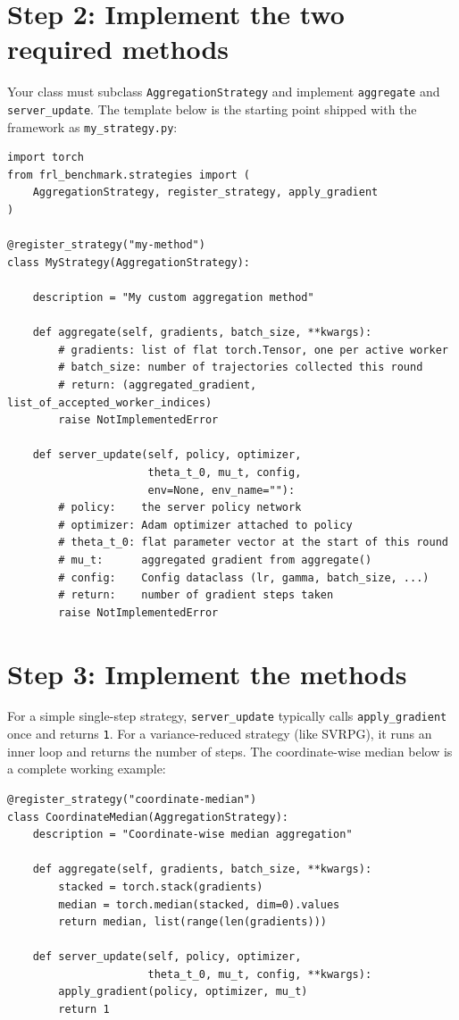 \documentclass[a4paper, oneside]{discothesis}
\begin{document}
\section*{Step 2: Implement the two required methods}

Your class must subclass \texttt{AggregationStrategy} and implement \texttt{aggregate} and \texttt{server\_update}. The template below is the starting point shipped with the framework as \texttt{my\_strategy.py}:

\begin{verbatim}
import torch
from frl_benchmark.strategies import (
    AggregationStrategy, register_strategy, apply_gradient
)

@register_strategy("my-method")
class MyStrategy(AggregationStrategy):

    description = "My custom aggregation method"

    def aggregate(self, gradients, batch_size, **kwargs):
        # gradients: list of flat torch.Tensor, one per active worker
        # batch_size: number of trajectories collected this round
        # return: (aggregated_gradient, list_of_accepted_worker_indices)
        raise NotImplementedError

    def server_update(self, policy, optimizer,
                      theta_t_0, mu_t, config,
                      env=None, env_name=""):
        # policy:    the server policy network
        # optimizer: Adam optimizer attached to policy
        # theta_t_0: flat parameter vector at the start of this round
        # mu_t:      aggregated gradient from aggregate()
        # config:    Config dataclass (lr, gamma, batch_size, ...)
        # return:    number of gradient steps taken
        raise NotImplementedError
\end{verbatim}

\section*{Step 3: Implement the methods}

For a simple single-step strategy, \texttt{server\_update} typically calls \texttt{apply\_gradient} once and returns \texttt{1}. For a variance-reduced strategy (like SVRPG), it runs an inner loop and returns the number of steps. The coordinate-wise median below is a complete working example:

\begin{verbatim}
@register_strategy("coordinate-median")
class CoordinateMedian(AggregationStrategy):
    description = "Coordinate-wise median aggregation"

    def aggregate(self, gradients, batch_size, **kwargs):
        stacked = torch.stack(gradients)
        median = torch.median(stacked, dim=0).values
        return median, list(range(len(gradients)))

    def server_update(self, policy, optimizer,
                      theta_t_0, mu_t, config, **kwargs):
        apply_gradient(policy, optimizer, mu_t)
        return 1
\end{verbatim}
\end{document}
